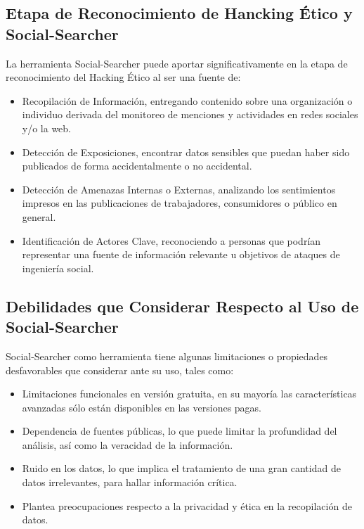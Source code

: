 \documentclass[stu, 11pt, letterpaper, donotrepeattitle, floatsintext, natbib]{apa7}
\begin{document}
\subsection{Etapa de Reconocimiento de Hancking Ético y Social-Searcher}

La herramienta Social-Searcher puede aportar significativamente en la etapa de reconocimiento del Hacking Ético al ser una fuente de:

\begin{itemize}
\item Recopilación de Información, entregando contenido sobre una organización o individuo derivada del monitoreo de menciones y actividades en redes sociales y/o la web.
\item Detección de Exposiciones, encontrar datos sensibles que puedan haber sido publicados de forma accidentalmente o no accidental.
\item Detección de Amenazas Internas o Externas, analizando los sentimientos impresos en las publicaciones de trabajadores, consumidores o público en general.
\item Identificación de Actores Clave, reconociendo a personas que podrían representar una fuente de información relevante u objetivos de ataques de ingeniería social.
\end{itemize}

\subsection{Debilidades que Considerar Respecto al Uso de Social-Searcher}

Social-Searcher como herramienta tiene algunas limitaciones o propiedades desfavorables que considerar ante su uso, tales como:

\begin{itemize}
\item Limitaciones funcionales en versión gratuita, en su mayoría las características avanzadas sólo están disponibles en las versiones pagas.
\item Dependencia de fuentes públicas, lo que puede limitar la profundidad del análisis, así como la veracidad de la información.
\item Ruido en los datos, lo que implica el tratamiento de una gran cantidad de datos irrelevantes, para hallar información crítica.
\item Plantea preocupaciones respecto a la privacidad y ética en la recopilación de datos.
\end{itemize}
\end{document}
